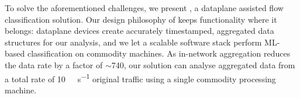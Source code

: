 


To solve the aforementioned challenges, we present \seidr{}, a dataplane assisted flow classification solution.
Our design philosophy of \seidr{} keeps functionality where it belongs: dataplane devices create accurately timestamped, aggregated data structures for our analysis, and we let a scalable software stack perform ML-based classification on commodity machines.
As in-network aggregation reduces the data rate by a factor of $\sim$\num{740}, our solution can analyse aggregated data from a total rate of \SI{10}{\tera\bit\per\second} original traffic using a single commodity processing machine.

